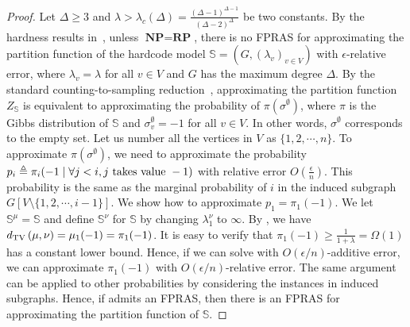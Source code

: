 \begin{proof}
Let $\Delta \geq 3$ and $\lambda > \lambda_c(\Delta) = \frac{(\Delta-1)^{\Delta-1}}{(\Delta-2)^{\Delta}}$ be two constants.
By the hardness results in~\cite{SlyS12,GalanisSV16}, unless $\textbf{NP}=\textbf{RP}$, there is no FPRAS for approximating the partition function of the hardcode model $\mathbb{S}=(G,(\lambda_v)_{v \in V})$ with $\epsilon$-relative error, where $\lambda_v = \lambda$ for all $v \in V$ and $G$ has the maximum degree $\Delta$. By the standard counting-to-sampling reduction~\cite{JVV86}, approximating the partition function $Z_{\mathbb{S}}$ is equivalent to approximating the probability of $\pi(\sigma^\emptyset)$, where $\pi$ is the Gibbs distribution of $\mathbb{S}$ and $\sigma^\emptyset_v = -1$ for all $v \in V$. In other words, $\sigma^\emptyset$ corresponds to the empty set.
Let us number all the vertices in $V$ as $\{1,2,\cdots,n\}$. To approximate $\pi(\sigma^\emptyset)$, we need to approximate the probability $p_i \triangleq \pi_i(-1 \mid \forall j < i, j \text{ takes value } -1)$  with relative error $O(\frac{\epsilon}{n})$. This probability is the same as the marginal probability of $i$ in the induced subgraph $G[V\setminus\{1,2,\cdots,i-1\}]$. We show how to approximate $p_1 = \pi_1(-1)$. We let $\mathbb{S}^\mu  = \mathbb{S}$ and define $\mathbb{S}^\nu$ for $\mathbb{S}$ by changing $\lambda^\nu_1$ to $\infty$. 
By , we have $d_{\mathrm{TV}}\left({\mu},{\nu}\right) = \mu_1(-1) = \pi_1(-1)$. It is easy to verify that $\pi_1(-1) \geq \frac{1}{1+\lambda} = \Omega(1)$ has a constant lower bound. Hence, if we can solve  with $O(\epsilon/n)$-additive error, we can approximate $\pi_1(-1)$ with $O(\epsilon/n)$-relative error. The same argument can be applied to other probabilities by considering the instances in induced subgraphs. Hence, if  admits an FPRAS, then there is an FPRAS for approximating the partition function of $\mathbb{S}$.
\end{proof}


